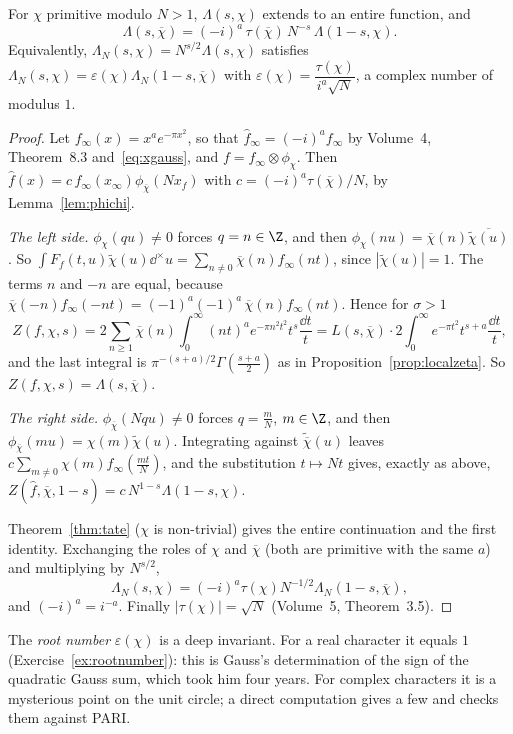 \begin{corollary}\label{cor:dirichletFE}
For $\chi$ primitive modulo $N>1$, $\Lambda(s,\chi)$ extends to an entire function, and
\[
\Lambda(s,\overline\chi)=(-i)^a\,\tau(\overline\chi)\,N^{-s}\,\Lambda(1-s,\chi).
\]
Equivalently, $\Lambda_N(s,\chi)=N^{s/2}\Lambda(s,\chi)$ satisfies $\Lambda_N(s,\chi)=\varepsilon(\chi)\Lambda_N(1-s,\overline\chi)$ with
$\varepsilon(\chi)=\dfrac{\tau(\chi)}{i^a\sqrt N}$, a complex number of modulus $1$.
\end{corollary}
\begin{proof}
Let $f_\infty(x)=x^ae^{-\pi x^2}$, so that $\hat f_\infty=(-i)^af_\infty$ by Volume~4, Theorem~8.3 and~\eqref{eq:xgauss}, and $f=f_\infty\otimes\phi_\chi$.
Then $\hat f(x)=c\,f_\infty(x_\infty)\phi_{\overline\chi}(Nx_f)$ with $c=(-i)^a\tau(\overline\chi)/N$, by Lemma~\ref{lem:phichi}.

\emph{The left side.} $\phi_\chi(qu)\ne0$ forces $q=n\in\Z$, and then $\phi_\chi(nu)=\overline\chi(n)\overline{\tilde\chi(u)}$. So
$\int F_f(t,u)\tilde\chi(u)\dd^\times u=\sum_{n\ne0}\overline\chi(n)f_\infty(nt)$, since $|\tilde\chi(u)|=1$. The terms $n$ and $-n$ are equal, because
$\overline\chi(-n)f_\infty(-nt)=(-1)^a(-1)^a\,\overline\chi(n)f_\infty(nt)$. Hence for $\sigma>1$
\[
Z(f,\chi,s)=2\sum_{n\ge1}\overline\chi(n)\int_0^\infty(nt)^ae^{-\pi n^2t^2}t^s\frac{\dd t}t=L(s,\overline\chi)\cdot2\int_0^\infty e^{-\pi t^2}t^{s+a}\frac{\dd t}t,
\]
and the last integral is $\pi^{-(s+a)/2}\Gamma(\frac{s+a}2)$ as in Proposition~\ref{prop:localzeta}. So $Z(f,\chi,s)=\Lambda(s,\overline\chi)$.

\emph{The right side.} $\phi_{\overline\chi}(Nqu)\ne0$ forces $q=\frac mN$, $m\in\Z$, and then $\phi_{\overline\chi}(mu)=\chi(m)\tilde\chi(u)$. Integrating against
$\tilde{\overline\chi}(u)$ leaves $c\sum_{m\ne0}\chi(m)f_\infty(\frac{mt}N)$, and the substitution $t\mapsto Nt$ gives, exactly as above,
$Z(\hat f,\overline\chi,1-s)=c\,N^{1-s}\Lambda(1-s,\chi)$.

Theorem~\ref{thm:tate} ($\chi$ is non-trivial) gives the entire continuation and the first identity. Exchanging the roles of $\chi$
and $\overline\chi$ (both are primitive with the same $a$) and multiplying by $N^{s/2}$,
\[
\Lambda_N(s,\chi)=(-i)^a\tau(\chi)N^{-1/2}\Lambda_N(1-s,\overline\chi),
\]
and $(-i)^a=i^{-a}$. Finally $|\tau(\chi)|=\sqrt N$ (Volume~5, Theorem~3.5).
\end{proof}

The \emph{root number} $\varepsilon(\chi)$ is a deep invariant. For a real character it equals $1$ (Exercise~\ref{ex:rootnumber}): this is Gauss's
determination of the sign of the quadratic Gauss sum, which took him four years. For complex characters it is a mysterious point on the
unit circle; a direct computation gives a few and checks them against PARI.

